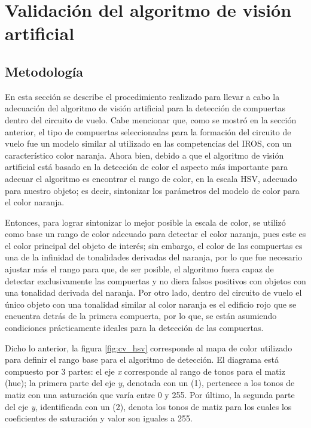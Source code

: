 \chapter{Validación del algoritmo de visión artificial}


\section{Metodología}
En esta sección se describe el procedimiento realizado para llevar a cabo la adecuación del algoritmo de visión artificial para la detección de compuertas dentro del circuito de vuelo. Cabe mencionar que, como se mostró en la sección anterior, el tipo de compuertas seleccionadas para la formación del circuito de vuelo fue un modelo similar al utilizado en las competencias del IROS, con un característico color naranja. Ahora bien, debido a que el algoritmo de visión artificial está basado en la detección de color el aspecto más importante para adecuar el algoritmo es encontrar el rango de color, en la escala HSV, adecuado para nuestro objeto; es decir, sintonizar los parámetros del modelo de color para el color naranja.

Entonces, para lograr sintonizar lo mejor posible la escala de color, se utilizó como base un rango de color adecuado para detectar el color naranja, pues este es el color principal del objeto de interés; sin embargo, el color de las compuertas es una de la infinidad de tonalidades derivadas del naranja, por lo que fue necesario ajustar más el rango para que, de ser posible, el algoritmo fuera capaz de detectar exclusivamente las compuertas y no diera falsos positivos con objetos con una tonalidad derivada del naranja. Por otro lado, dentro del circuito de vuelo el único objeto con una tonalidad similar al color naranja es el edificio rojo que se encuentra detrás de la primera compuerta, por lo que, se están asumiendo condiciones prácticamente ideales para la detección de las compuertas.

Dicho lo anterior, la figura \ref{fig:cv_hsv} corresponde al mapa de color utilizado para definir el rango base para el algoritmo de detección. El diagrama está compuesto por 3 partes: el eje \textit{x} corresponde al rango de tonos para el matiz (hue); la primera parte del eje \textit{y}, denotada con un (1), pertenece a los tonos de matiz con una saturación que varía entre 0 y 255. Por último, la segunda parte del eje \textit{y}, identificada con un (2), denota los tonos de matiz para los cuales los coeficientes de saturación y valor son iguales a 255. 

